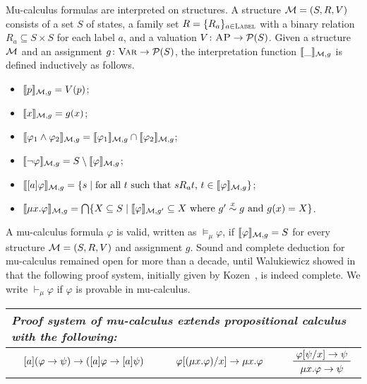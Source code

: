 \documentclass{amsart}
\begin{document}
Mu-calculus formulas are interpreted on structures.
A structure $\mathcal{M} = (S, R, V)$ consists of
a set $S$ of states,
a family set $R = \{R_a\}_{a \in \textsc{Label}}$ with a binary relation $R_a \subseteq S \times S$
for each label $a$,
and a valuation $V \colon \textsc{AP} \to \mathcal{P}(S)$.
Given a structure $\mathcal{M}$ and an assignment $g \colon {\normalfont\textsc{Var}} \to \mathcal{P}(S)$,
the interpretation function
$\llbracket\_\rrbracket_{\mathcal{M},g}$ is defined inductively as follows.
\begin{itemize}
\item $\llbracket p\rrbracket_{\mathcal{M},g} = V(p)$;
\item $\llbracket x\rrbracket_{\mathcal{M},g} = g(x)$;
\item $\llbracket\varphi_1 \wedge \varphi_2\rrbracket_{\mathcal{M},g} =
       \llbracket\varphi_1\rrbracket_{\mathcal{M},g} \cap
       \llbracket\varphi_2\rrbracket_{\mathcal{M},g}$;
\item $\llbracket\neg \varphi\rrbracket_{\mathcal{M},g} =
       S \setminus \llbracket\varphi\rrbracket_{\mathcal{M},g}$;    
\item $\llbracket[a]\varphi\rrbracket_{\mathcal{M},g} =
       \{ s \mid \text{for all $t$ such that $s R_a t$, 
       	  $t \in \llbracket\varphi\rrbracket_{\mathcal{M},g}$} \}$;
\item $\llbracket\mu x . \varphi\rrbracket_{\mathcal{M},g} =
       \bigcap \{ X \subseteq S \mid \llbracket\varphi\rrbracket_{\mathcal{M},g'} \subseteq X
       \text{ where $g' \overset{x}{\sim} g$ and $g(x) = X$} \}$.
\end{itemize}
A mu-calculus formula $\varphi$ is valid, written as $\vDash_\mu \varphi$,
if $\llbracket\varphi\rrbracket_{\mathcal{M},g} = S$ for every structure $\mathcal{M} = (S,R,V)$ and assignment $g$.
Sound and complete deduction for mu-calculus remained open for more than a decade,
until Walukiewicz showed in~\cite{bibid} that
the following proof system, initially given by Kozen~\cite{bibid}, 
is indeed complete.
We write $\vdash_\mu \varphi$ if $\varphi$ is provable in mu-calculus.
\begin{center}
\begin{tabular}{lllllm{2cm}}
	\multicolumn{6}{l}{\em Proof system of mu-calculus extends
		propositional calculus with the following:}
	\\\hline
	\prule{K}&
	$[a](\varphi \to \psi) \to
	([a]\varphi \to [a]\psi)$
	&
	\prule{Mu$_1$}&
	$\varphi[(\mu x . \varphi) / x] \to \mu x . \varphi$
	&
	\prule{Mu$_2$}&
	$\prftree{\varphi[\psi / x] \imp \psi}{\mu x . \varphi \imp \psi}$
\end{tabular}
\end{center}
\end{document}
